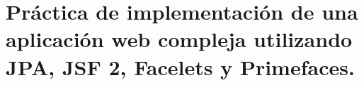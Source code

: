\chapter[Pr\'{a}ctica 2]{Pr\'{a}ctica de implementaci\'{o}n de una aplicaci\'{o}n web compleja utilizando JPA, JSF 2, Facelets y Primefaces.}


 
